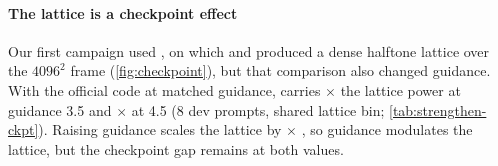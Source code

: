 \paragraph{The lattice is a checkpoint effect}
Our first campaign used \fluxdev, on which \dype{} and \constancy{} produced a dense halftone lattice over the $4096^2$ frame (\cref{fig:checkpoint}), but that comparison also changed guidance. With the official \dype{} code at matched guidance, \fluxdev{} carries $\times$  the \krea{} lattice power at guidance 3.5 and $\times$  at 4.5 (8 dev prompts, shared lattice bin; \cref{tab:strengthen-ckpt}). Raising guidance scales the \fluxdev{} lattice by $\times$ , so guidance modulates the lattice, but the checkpoint gap remains at both values.
